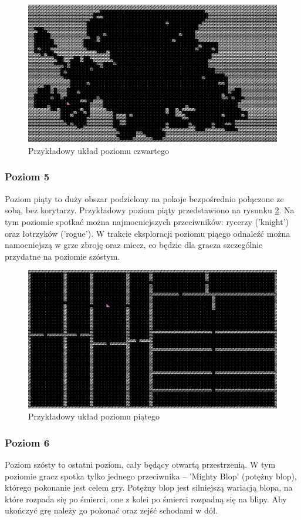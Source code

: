 \documentclass[12pt,twoside]{article}
\begin{document}
\FloatBarrier
\begin{figure}[h]
	\centering
	\includegraphics[width=12cm]{images/mygame/map4.png}
	\caption{Przykładowy układ poziomu czwartego}
	\label{mygame:map4}
\end{figure}
\FloatBarrier

\subsubsection{Poziom 5}
Poziom piąty to duży obszar podzielony na pokoje bezpośrednio połączone ze sobą, bez korytarzy. Przykładowy poziom piąty przedstawiono na rysunku \ref{mygame:map5}. Na tym poziomie spotkać można najmocniejszych przeciwników: rycerzy ('knight') oraz łotrzyków ('rogue'). W trakcie eksploracji poziomu piąego odnaleźć można namocniejszą w grze zbroję oraz miecz, co będzie dla gracza szczególnie przydatne na poziomie szóstym.

\FloatBarrier
\begin{figure}[h]
	\centering
	\includegraphics[width=12cm]{images/mygame/map5.png}
	\caption{Przykładowy układ poziomu piątego}
	\label{mygame:map5}
\end{figure}
\FloatBarrier


\subsubsection{Poziom 6}
Poziom szósty to ostatni poziom, cały będący otwartą przestrzenią. W tym poziomie gracz spotka tylko jednego przeciwnika -- 'Mighty Blop' (potężny blop), którego pokonanie jest celem gry. Potężny blop jest silniejszą wariacją blopa, na które rozpada się po śmierci, one z kolei po śmierci rozpadną się na blipy. Aby ukończyć grę należy go pokonać oraz zejść schodami w dół.
\end{document}
